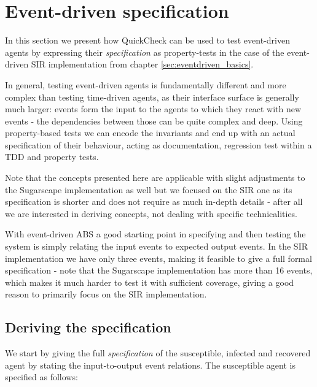 \section{Event-driven specification}
In this section we present how QuickCheck can be used to test event-driven agents by expressing their \textit{specification} as property-tests in the case of the event-driven SIR implementation from chapter \ref{sec:eventdriven_basics}.

In general, testing event-driven agents is fundamentally different and more complex than testing time-driven agents, as their interface surface is generally much larger: events form the input to the agents to which they react with new events - the dependencies between those can be quite complex and deep. Using property-based tests we can encode the invariants and end up with an actual specification of their behaviour, acting as documentation, regression test within a TDD and property tests.

Note that the concepts presented here are applicable with slight adjustments to the Sugarscape implementation as well but we focused on the SIR one as its specification is shorter and does not require as much in-depth details - after all we are interested in deriving concepts, not dealing with specific technicalities.

With event-driven ABS a good starting point in specifying and then testing the system is simply relating the input events to expected output events. In the SIR implementation we have only three events, making it feasible to give a full formal specification - note that the Sugarscape implementation has more than 16 events, which makes it much harder to test it with sufficient coverage, giving a good reason to primarily focus on the SIR implementation. 

\subsection{Deriving the specification}
We start by giving the full \textit{specification} of the susceptible, infected and recovered agent by stating the input-to-output event relations. The susceptible agent is specified as follows:

